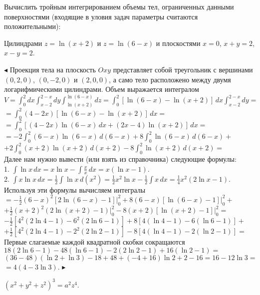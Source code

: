 \documentclass[a5paper,10pt]{article}
\begin{document}
\medskip
\noindent
Вычислить тройным интегрированием объемы тел, ограниченных данными поверхностями (входящие в уловия задач параметры считаются положительными):

\medskip
{} Цилиндрами $z=\ln(x+2)$ и $z=\ln(6-x)$ и плоскостями $x=0$, $x+y=2$, $x-y=2$.

\smallskip
\noindent $\blacktriangleleft$ Проекция тела на плоскость $Oxy$ представляет собой треугольник
с вершинами $(0,2,0)$, $(0,-2,0)$ и $(2,0,0)$, а само тело расположено между двумя логарифмическими
цилиндрами. Объем выражается интегралом\\
$\displaystyle V=\int_0^2dx\int_{x-2}^{2-x}dy\int_{\ln(x+2)}^{\ln(6-x)}dz=
\int_0^2[\ln(6-x)-\ln(x+2)]\,dx\int_{x-2}^{2-x}dy=$\\
$\displaystyle =\int_0^2(4-2x)[\ln(6-x)-\ln(x+2)]\,dx=$\\
$\displaystyle =\int_0^2[(4-2x)\ln(6-x)\,dx+(2x-4)\ln(x+2)]\,dx=$\\
$\displaystyle =-2\int_0^2(6-x)\ln(6-x)\,d(6-x)+8\int_0^2\ln(6-x)\,d(6-x)+$\\
$\displaystyle +2\int_0^2(x+2)\ln(x+2)\,d(x+2)-8\int_0^2\ln(x+2)\,d(x+2)=$\\
Далее нам нужно вывести (или взять из справочника) следующие формулы:\\
1. $\displaystyle\int\ln x\,dx=x\ln x-\int\frac xx\,dx=x(\ln x-1)$.\\
2. $\displaystyle\int x\ln x\,dx=\frac12\int\ln x\,d(x^2)=\frac12x^2\ln x-\frac12\int x\,dx=\frac14x^2(2\ln x-1)$.\\
Используя эти формулы вычисляем интегралы\\
$\displaystyle =-\frac12(6-x)^2[2\ln(6-x)-1]\Big|_0^2+8(6-x)[\ln(6-x)-1]\Big|_0^2+$\\
$\displaystyle +\frac12(x+2)^2(2\ln(x+2)-1)\Big|_0^2-8(x+2)[\ln(x+2)-1]\Big|_0^2=$\\
$\displaystyle -\frac12[4^2(2\ln4-1)-6^2(2\ln6-1)]+8[4(\ln4-1)-6(\ln6-1)]+$\\
$\displaystyle +\frac12[4^2(2\ln4-1)-2^2(2\ln2-1)]-8[4(\ln4-1)-2(\ln2-1)]=$\\
Первые слагаемые каждой квадратной скобки сокращаются\\
$18(2\ln6-1)-48(\ln6-1)-2(2\ln2-1)+16(\ln2-1)=$\\
$(36-48)(\ln2+\ln3)-18+48+(-4+16)\ln2+2-16=16-12\ln3=$\\
$=4(4-3\ln3).$ $\blacktriangleright$

\medskip
{} $(x^2+y^2+z^2)^3=a^2z^4$.
\end{document}
